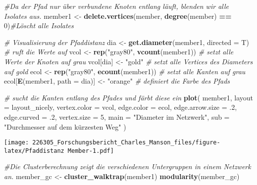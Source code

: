 \documentclass[
]{article}
\newenvironment{Shaded}{\begin{snugshade}}{\end{snugshade}}
\newcommand{\CommentTok}[1]{\textcolor[rgb]{0.56,0.35,0.01}{\textit{#1}}}
\newcommand{\DataTypeTok}[1]{\textcolor[rgb]{0.13,0.29,0.53}{#1}}
\newcommand{\DecValTok}[1]{\textcolor[rgb]{0.00,0.00,0.81}{#1}}
\newcommand{\FloatTok}[1]{\textcolor[rgb]{0.00,0.00,0.81}{#1}}
\newcommand{\KeywordTok}[1]{\textcolor[rgb]{0.13,0.29,0.53}{\textbf{#1}}}
\newcommand{\NormalTok}[1]{#1}
\newcommand{\OperatorTok}[1]{\textcolor[rgb]{0.81,0.36,0.00}{\textbf{#1}}}
\newcommand{\StringTok}[1]{\textcolor[rgb]{0.31,0.60,0.02}{#1}}
\begin{document}
\begin{Shaded}
\begin{Highlighting}[]
\CommentTok{#Da der Pfad nur über verbundene Knoten entlang läuft, blenden wir alle Isolates aus.}
\NormalTok{member1 <-}
\StringTok{  }\KeywordTok{delete.vertices}\NormalTok{(member, }\KeywordTok{degree}\NormalTok{(member) }\OperatorTok{==}\StringTok{ }\DecValTok{0}\NormalTok{)}\CommentTok{#Löscht alle Isolates}

\CommentTok{# Visualisierung der Pfaddistanz}
\NormalTok{dia <-}\StringTok{ }\KeywordTok{get.diameter}\NormalTok{(member1, }\DataTypeTok{directed =}\NormalTok{ T) }\CommentTok{# ruft die Werte auf}
\NormalTok{vcol <-}
\StringTok{  }\KeywordTok{rep}\NormalTok{(}\StringTok{"gray80"}\NormalTok{, }\KeywordTok{vcount}\NormalTok{(member1)) }\CommentTok{# setzt alle Werte der Knoten auf grau}
\NormalTok{vcol[dia] <-}\StringTok{ "gold"} \CommentTok{# setzt alle Vertices des Diameters auf gold}
\NormalTok{ecol <-}\StringTok{ }\KeywordTok{rep}\NormalTok{(}\StringTok{"gray80"}\NormalTok{, }\KeywordTok{ecount}\NormalTok{(member1)) }\CommentTok{# setzt alle Kanten auf grau}
\NormalTok{ecol[}\KeywordTok{E}\NormalTok{(member1, }\DataTypeTok{path =}\NormalTok{ dia)] <-}
\StringTok{  "orange"} \CommentTok{# definiert die Farbe des Pfads}

\CommentTok{# sucht die Kanten entlang des Pfades und färbt diese ein}
\KeywordTok{plot}\NormalTok{(}
\NormalTok{  member1,}
  \DataTypeTok{layout =}\NormalTok{ layout_nicely,}
  \DataTypeTok{vertex.color =}\NormalTok{ vcol,}
  \DataTypeTok{edge.color =}\NormalTok{ ecol,}
  \DataTypeTok{edge.arrow.size =} \FloatTok{.2}\NormalTok{,}
  \DataTypeTok{edge.curved =} \FloatTok{.2}\NormalTok{,}
  \DataTypeTok{vertex.size =} \DecValTok{5}\NormalTok{,}
  \DataTypeTok{main =} \StringTok{"Diameter im Netzwerk"}\NormalTok{,}
  \DataTypeTok{sub =} \StringTok{"Durchmesser auf dem kürzesten Weg"}
\NormalTok{)}
\end{Highlighting}
\end{Shaded}

\texttt{[image: 226305\_Forschungsbericht\_Charles\_Manson\_files/figure-latex/Pfaddistanz Member-1.pdf]}

\begin{Shaded}
\begin{Highlighting}[]
\CommentTok{#Die Clusterberechnung zeigt die verschiedenen Untergruppen in einem Netzwerk an.}
\NormalTok{member_gc <-}\StringTok{ }\KeywordTok{cluster_walktrap}\NormalTok{(member1)}
\KeywordTok{modularity}\NormalTok{(member_gc)}
\end{Highlighting}
\end{Shaded}
\end{document}
